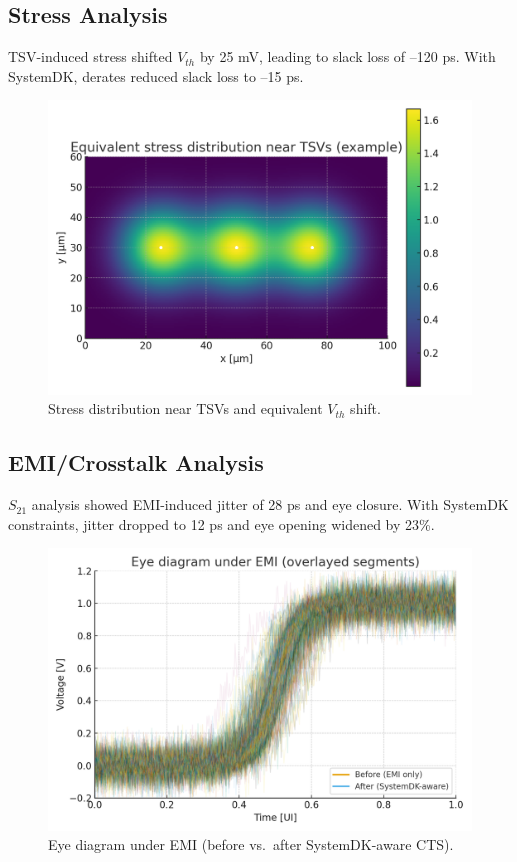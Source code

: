 \documentclass[conference]{IEEEtran}
\begin{document}
\subsection{Stress Analysis}
TSV-induced stress shifted $V_{th}$ by 25 mV, leading to slack loss of --120 ps. With SystemDK, derates reduced slack loss to --15 ps.

\begin{figure}[htbp]
  \centering
  \includegraphics[width=0.85\linewidth]{stress_map}
  \caption{Stress distribution near TSVs and equivalent $V_{th}$ shift.}
  \label{fig:stress}
\end{figure}

\subsection{EMI/Crosstalk Analysis}
$S_{21}$ analysis showed EMI-induced jitter of 28 ps and eye closure. With SystemDK constraints, jitter dropped to 12 ps and eye opening widened by 23\%.

\begin{figure}[htbp]
  \centering
  \includegraphics[width=0.85\linewidth]{eye_diagram}
  \caption{Eye diagram under EMI (before vs.\ after SystemDK-aware CTS).}
  \label{fig:eye}
\end{figure}
\end{document}
